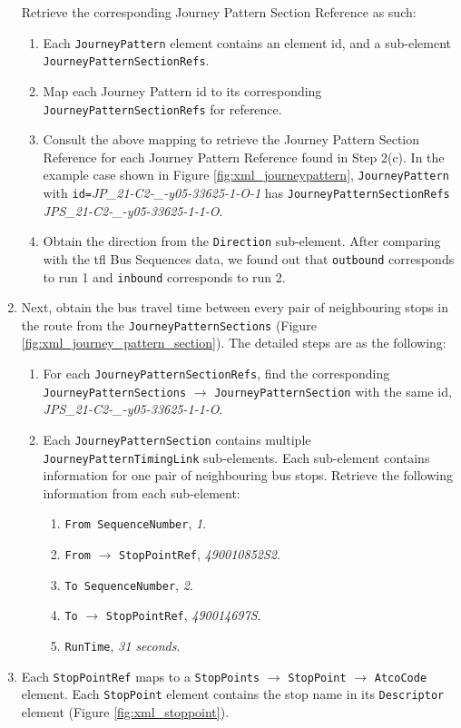 \begin{enumerate}
  Retrieve the corresponding Journey Pattern Section Reference as such:
    \begin{enumerate}
      \item Each \texttt{JourneyPattern} element contains an element id, and a sub-element \texttt{JourneyPatternSectionRefs}.
      \item Map each Journey Pattern id to its corresponding \\ \texttt{JourneyPatternSectionRefs} for reference.
      \item Consult the above mapping to retrieve the Journey Pattern Section Reference for each Journey Pattern Reference found in Step 2(c). In the example case shown in Figure \ref{fig:xml_journeypattern}, \texttt{JourneyPattern} with \texttt{id=}\textit{JP\_21-C2-\_-y05-33625-1-O-1} has \texttt{JourneyPatternSectionRefs} \textit{JPS\_21-C2-\_-y05-33625-1-1-O}.
      \item Obtain the direction from the \texttt{Direction} sub-element. After comparing with the \acrshort{tfl} Bus Sequences data, we found out that \texttt{outbound} corresponds to run 1 and \texttt{inbound} corresponds to run 2.
    \end{enumerate}
    \item Next, obtain the bus travel time between every pair of neighbouring stops in the route from the \texttt{JourneyPatternSections} (Figure \ref{fig:xml_journey_pattern_section}). The detailed steps are as the following:
    \begin{enumerate}
      \item For each \texttt{JourneyPatternSectionRefs}, find the corresponding \texttt{JourneyPatternSections} $\rightarrow$ \texttt{JourneyPatternSection} with the same id, \textit{JPS\_21-C2-\_-y05-33625-1-1-O}.
      \item Each \texttt{JourneyPatternSection} contains multiple \\ \texttt{JourneyPatternTimingLink} sub-elements. Each sub-element contains information for one pair of neighbouring bus stops. Retrieve the following information from each sub-element:
      \begin{enumerate}
        \item \texttt{From SequenceNumber}, \textit{1}.
        \item \texttt{From} $\rightarrow$ \texttt{StopPointRef}, \textit{490010852S2}.
        \item \texttt{To SequenceNumber}, \textit{2}.
        \item \texttt{To} $\rightarrow$ \texttt{StopPointRef}, \textit{490014697S}.
        \item \texttt{RunTime}, \textit{31 seconds}.
      \end{enumerate}
    \end{enumerate}
    \item Each \texttt{StopPointRef} maps to a \texttt{StopPoints} $\rightarrow$ \texttt{StopPoint} $\rightarrow$ \texttt{AtcoCode} element. Each \texttt{StopPoint} element contains the stop name in its \texttt{Descriptor} element (Figure \ref{fig:xml_stoppoint}).


\end{enumerate}
